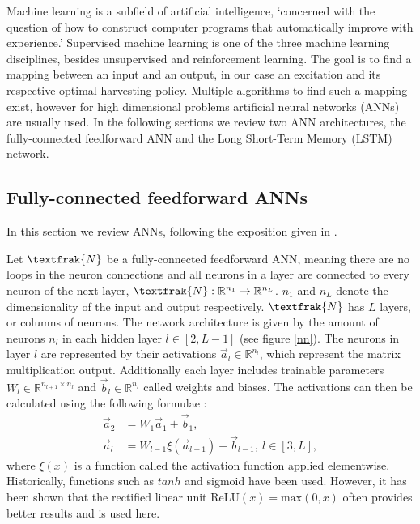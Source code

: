 Machine learning is a subfield of artificial intelligence, `concerned with the question of how to construct computer programs that automatically improve with experience.' \cite{Mitchell97}
Supervised machine learning is one of the three machine learning disciplines, besides unsupervised and reinforcement learning.
The goal is to find a mapping between an input and an output, in our case an excitation and its respective optimal harvesting policy.
Multiple algorithms to find such a mapping exist, however for high dimensional problems artificial neural networks (ANNs) are usually used.
In the following sections we review two ANN architectures, the fully-connected feedforward ANN and the Long Short-Term Memory (LSTM) network.

\subsection{Fully-connected feedforward ANNs}
In this section we review ANNs, following the exposition given in \cite{lu2020dying}.

Let $\textfrak{N}$ be a fully-connected feedforward ANN, meaning there are no loops in the neuron connections and all neurons in a layer are connected to every neuron of the next layer, $\textfrak{N}: \mathbb{R}^{n_1} \to \mathbb{R}^{n_L}$. $n_1$ and $n_L$ denote the dimensionality of the input and output respectively. 
$\textfrak{N}$ has $L$ layers, or columns of neurons.
The network architecture is given by the amount of neurons $n_l$ in each hidden layer $l \in [2, L - 1]$ (see figure \ref{nn}).
The neurons in layer $l$ are represented by their activations $\vec{a}_l \in \mathbb{R}^{n_l}$, which represent the matrix multiplication output. Additionally each layer includes trainable parameters $W_l \in \mathbb{R}^{n_{l+1} \times n_{l}}$ and $\vec{b}_l \in \mathbb{R}^{n_l}$ called weights and biases.
The activations can then be calculated using the following formulae \cite{TN_libero_mab2)53517}:
\begin{align*}
	\vec{a}_2 & = W_1 \vec{a}_1 + \vec{b}_1, \\
	\vec{a}_l & = W_{l-1} \xi(\vec{a}_{l-1}) + \vec{b}_{l-1}, \ l \in [3, L],
\end{align*}
where $\xi(x)$ is a function called the activation function applied elementwise. Historically, functions such as $tanh$ and sigmoid have been used. However, it has been shown \cite{Maas2013RectifierNI, krizhevsky} that the rectified linear unit $\mathrm{ReLU}(x) = \mathrm{max}(0, x)$ often provides better results and is used here.


